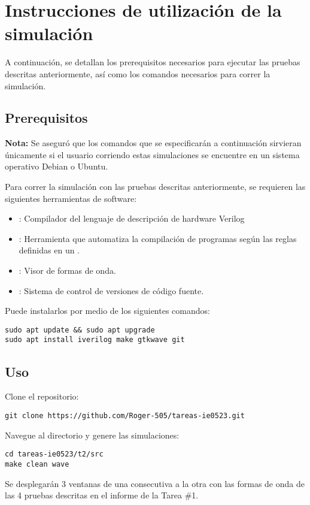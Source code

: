 \section{Instrucciones de utilización de la simulación}
A continuación, se detallan los prerequisitos necesarios para ejecutar las pruebas descritas anteriormente, así como los comandos necesarios para correr la simulación. 

\subsection{Prerequisitos}
\textbf{Nota:} Se aseguró que los comandos que se especificarán a continuación sirvieran únicamente si el usuario corriendo estas simulaciones se encuentre en un sistema operativo Debian o Ubuntu.

Para correr la simulación con las pruebas descritas anteriormente, se requieren las siguientes herramientas de software:
\begin{itemize}
    \item {}: Compilador del lenguaje de descripción de hardware Verilog
    \item {}: Herramienta que automatiza la compilación de programas según las reglas definidas en un .
    \item {}: Visor de formas de onda.
    \item {}: Sistema de control de versiones de código fuente.
\end{itemize}

Puede instalarlos por medio de los siguientes comandos:

\begin{verbatim}
sudo apt update && sudo apt upgrade
sudo apt install iverilog make gtkwave git 
\end{verbatim}

\subsection{Uso}
Clone el repositorio:
\begin{verbatim}
git clone https://github.com/Roger-505/tareas-ie0523.git
\end{verbatim}
Navegue al directorio  y genere las simulaciones:
\begin{verbatim}
cd tareas-ie0523/t2/src    
make clean wave
\end{verbatim}
Se desplegarán 3 ventanas de  una consecutiva a la otra con las formas de onda de las 4 pruebas descritas en el informe de la Tarea \#1.
